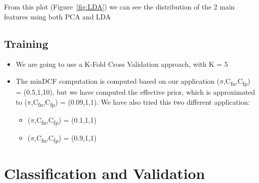 \documentclass[english]{report}
\begin{document}
    From this plot (Figure~\ref{fig:LDA}) we can see the distribution of the 2 main features using both PCA and LDA

\section{Training}
    \begin{itemize}
        \item We are going to use a K-Fold Cross Validation approach, with K = 5
        \item The minDCF computation is computed based on our application ($\pi$,C\textsubscript{fn},C\textsubscript{fp}) = (0.5,1,10), but we have
        computed the effective prior, which is approximated to ($\pi$,C\textsubscript{fn},C\textsubscript{fp}) = (0.09,1,1).\newline
        We have also tried this two different application:
        \begin{itemize}
            \item ($\pi$,C\textsubscript{fn},C\textsubscript{fp}) = (0.1,1,1)
            \item ($\pi$,C\textsubscript{fn},C\textsubscript{fp}) = (0.9,1,1)
        \end{itemize}
    \end{itemize}

\chapter{Classification and Validation}
\end{document}
